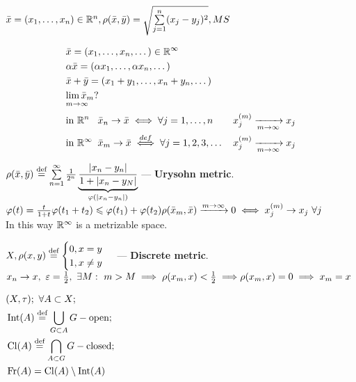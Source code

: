 \begin{ex}
  $\bar{x} = (x_1, \dotsc, x_n) \in \R^n, \rho(\bar{x}, \bar{y}) = \sqrt{\sum\limits_{j = 1}^n(x_j - y_j)^2}, MS$
\end{ex}
\begin{ex}
  \begin{align*}
    & \bar{x} = (x_1, \dotsc, x_n, \dotso) \in \R^\infty \\
    & \alpha\bar{x} = (\alpha x_1, \dotsc, \alpha x_n, \dotso) \\
    & \bar{x} + \bar{y} = (x_1 + y_1, \dotsc, x_n + y_n, \dotso)\\
    & \alim{\bar{x}_m}{m \to \infty}?\\
    & \textnormal{in}\ \R^n\hphantom{{}^\infty}\bar{x}_n \to \bar{x} \iff \forall j = 1,
      \dotsc, n\quad\ \ \:\,x_j^{(m)} \xrightarrow[m \to \infty]{} x_j \\
    & \textnormal{in}\ \R^{\infty}\hphantom{{}^n}\bar{x}_m \to \bar{x} \overset{def}{\iff} \forall j = 1,2,3,\dotso \quad x_j^{(m)} \xrightarrow[m \to \infty]{} x_j
  \end{align*}
\end{ex}
\begin{defn}
  $\rho(\bar{x}, \bar{y}) \defeq \sum\limits_{n = 1}^\infty \frac{1}{2^n}\underbrace{\frac{|x_n - y_n|}{1 + |x_n - y_N|}}_{\phi(|x_n - y_n|)}$
  --- \textbf{Urysohn metric}. \\
  $\phi(t) = \frac{t}{1 + t} \\
  \phi(t_1 + t_2) \leq \phi(t_1) + \phi(t_2) \\
  \rho(\bar{x}_m, \bar{x}) \xrightarrow{m \to \infty} 0 \iff x_j^{(m)} \to x_j\ \forall j$\\
  In this way $\R^\infty$ is a metrizable space.
\end{defn}
\begin{ex}
$X, \rho(x, y) \defeq
\begin{cases}
  0, x = y
  \\1, x \neq y
\end{cases}$ --- \textbf{Discrete metric}. \\
$x_n \to x,\ \epsilon = \frac{1}{2},\ \exists M:\ m > M \implies \rho(x_m, x) < \frac{1}{2} \implies\\
\rho(x_m, x) = 0 \implies x_m = x$
\end{ex}
\begin{defn}
  $\begin{aligned}[t]
    & (X, \tau);\ \forall A \subset X; \\
    & \inter{A} \defeq \bigcup\limits_{G \subset A} G - \textnormal{open}; \\
    & \cl{A} \defeq \bigcap\limits_{A \subset G} G - \textnormal{closed}; \\
    & \fr{A} = \cl{A} \setminus \inter{A}
  \end{aligned}$
\end{defn}
